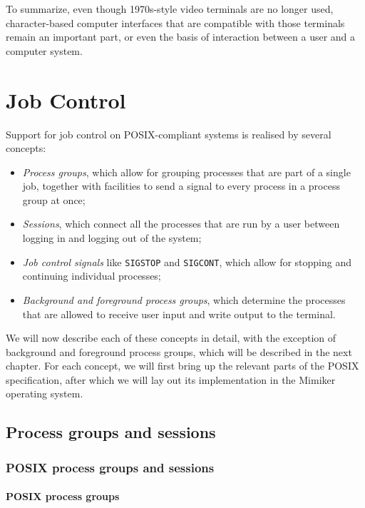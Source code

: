 \documentclass[shortabstract, manyadvisors, english, mgr]{iithesis}
\begin{document}
To summarize, even though 1970s-style video terminals are no longer used,
character-based computer interfaces that are compatible with those terminals
remain an important part, or even the basis of interaction between a user and a
computer system.

\chapter{Job Control}

Support for job control on POSIX-compliant systems is realised by several
concepts:
\begin{itemize}
\item \textit{Process groups}, which allow for grouping processes that are part
  of a single job, together with facilities to send a signal to every process in
  a process group at once;
\item \textit{Sessions}, which connect all the processes that are run by a user
  between logging in and logging out of the system;
\item \textit{Job control signals} like \texttt{SIGSTOP} and \texttt{SIGCONT},
  which allow for stopping and continuing individual processes;
\item \textit{Background and foreground process groups}, which determine the
  processes that are allowed to receive user input and write output to the
  terminal.
\end{itemize}

We will now describe each of these concepts in detail, with the exception of
background and foreground process groups, which will be described in the next chapter.
For each concept, we will first bring up the relevant parts of the POSIX
specification, after which we will lay out its implementation in the Mimiker
operating system.

\section{Process groups and sessions}

\subsection{POSIX process groups and sessions}

\subsubsection{POSIX process groups}
\end{document}

